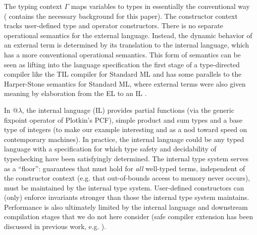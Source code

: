 \documentclass[9pt,preprint]{sigplanconf}
\begin{document}
The typing context $\Gamma$ maps variables to types in essentially the conventional way (\cite{pfpl} contains the necessary background for this paper). The constructor context tracks user-defined type and operator constructors. %
There is no separate operational semantics for the external language. Instead, the dynamic behavior of an external term is determined by its translation to the internal language, which has a more conventional operational semantics. This form of semantics can be seen as lifting into the language specification the first stage of a type-directed compiler like the TIL compiler for Standard ML \cite{tarditi+:til-OLD} and has some parallels to the Harper-Stone semantics for Standard ML, where external terms were also given meaning by elaboration from the EL to an IL \cite{Harper00atype-theoretic}. %

In @$\lambda$, the internal language (IL) provides partial functions (via the generic fixpoint operator of Plotkin's PCF), simple product and sum types and a base type of integers (to make our example interesting and as a nod toward speed on contemporary machines). In practice, the internal language could be any typed  language with a specification for which type safety and decidability of typechecking have been satisfyingly determined. The internal type system serves as a ``floor'': guarantees that must hold for \emph{all} well-typed terms, independent of the constructor context (e.g. that out-of-bounds access to memory never occurs), must be maintained by the internal type system. User-defined constructors can (only) enforce invariants stronger than those the internal type system maintains. Performance is also ultimately limited by the internal language and downstream compilation stages that we do not here consider (safe compiler extension has been discussed in previous work, e.g. \cite{conf/pldi/TatlockL10}).
\end{document}
